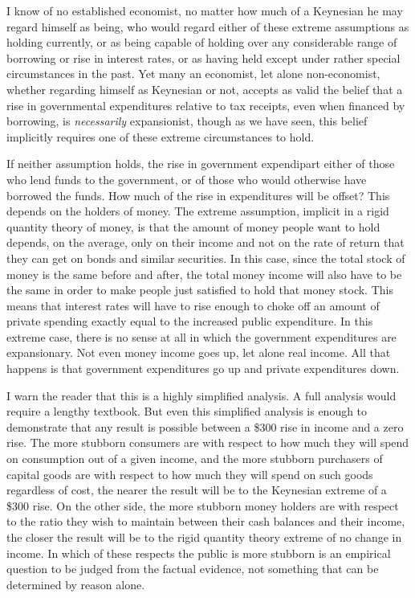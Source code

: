 \documentclass[11pt,openany]{book}
\begin{document}
I know of no established economist, no matter how much of a Keynesian he may regard himself as being, who would regard either of these extreme assumptions as holding currently, or as being capable of holding over any considerable range of borrowing or rise in interest rates, or as having held except under rather special circumstances in the past. Yet many an economist, let alone non-economist, whether regarding himself as Keynesian or not, accepts as valid the belief that a rise in governmental expenditures relative to tax receipts, even when financed by borrowing, is \emph{necessarily} expansionist, though as we have seen, this belief implicitly requires one of these extreme circumstances to hold.

If neither assumption holds, the rise in government expendipart either of those who lend funds to the government, or of those who would otherwise have borrowed the funds. How much of the rise in expenditures will be offset? This depends on the holders of money. The extreme assumption, implicit in a rigid quantity theory of money, is that the amount of money people want to hold depends, on the average, only on their income and not on the rate of return that they can get on bonds and similar securities. In this case, since the total stock of money is the same before and after, the total money income will also have to be the same in order to make people just satisfied to hold that money stock. This means that interest rates will have to rise enough to choke off an amount of private spending exactly equal to the increased public expenditure. In this extreme case, there is no sense at all in which the government expenditures are expansionary. Not even money income goes up, let alone real income. All that happens is that government expenditures go up and private expenditures down.

I warn the reader that this is a highly simplified analysis. A full analysis would require a lengthy textbook. But even this simplified analysis is enough to demonstrate that any result is possible between a \$300 rise in income and a zero rise. The more stubborn consumers are with respect to how much they will spend on consumption out of a given income, and the more stubborn purchasers of capital goods are with respect to how much they will spend on such goods regardless of cost, the nearer the result will be to the Keynesian extreme of a \$300 rise. On the other side, the more stubborn money holders are with respect to the ratio they wish to maintain between their cash balances and their income, the closer the result will be to the rigid quantity theory extreme of no change in income. In which of these respects the public is more stubborn is an empirical question to be judged from the factual evidence, not something that can be determined by reason alone.
\end{document}
